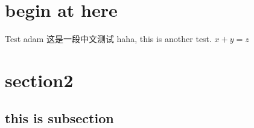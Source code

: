 \section{begin at here}
\begin{frame}{Test}
adam\cite{adams1995hitchhiker}    
这是一段中文测试
haha, this is another test.
$x + y  = z$

\end{frame}


\section{section2}
\subsection{this is subsection}
